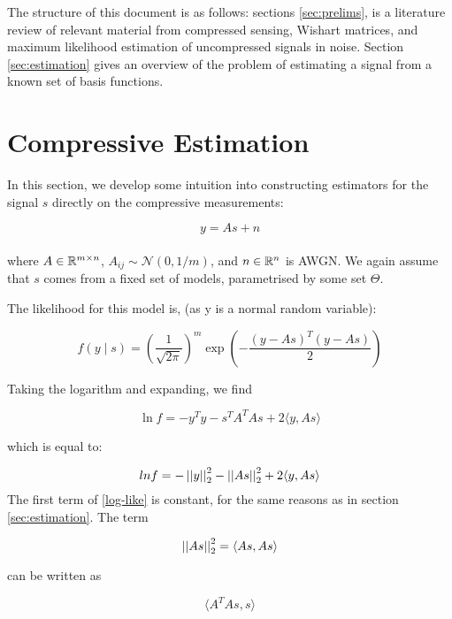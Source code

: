 The structure of this document is as follows: sections \eqref{sec:prelims}, is a literature review of relevant material from compressed sensing, Wishart matrices, and maximum likelihood estimation of uncompressed signals in noise. Section \eqref{sec:estimation} gives an overview of the problem of estimating a signal from a known set of basis functions. 

\section{Compressive Estimation} \label{sec:estimation}
In this section, we develop some intuition into constructing estimators for the signal \(s\) directly on the compressive measurements:

\begin{equation}
y = As + n
\end{equation}
\\
where \(A \in {\mathbb{R}}^{m \times n} \), \(A_{ij} \sim \mathcal{N}\left(0,1/m\right)\), and \(n \in {\mathbb{R}}^n\) is AWGN. We again assume that \(s\) comes from a fixed set of models, parametrised by some set \(\Theta\). 

The likelihood for this model is, (as y is a normal random variable):

\begin{equation}
f\left(y \mid s\right) = \left(\frac{1}{\sqrt{2\pi}} \right)^m \exp{\left( - \frac{\left(y-As\right)^T  \left(y-As\right)}{2} \right)}
\end{equation}

Taking the logarithm and expanding, we find

\begin{equation}
\ln{f} = -y^Ty - s^TA^TAs + 2\langle y, As \rangle
\end{equation}

which is equal to:

\begin{equation}
ln{f} = - \left|\left|y\right|\right|_2^2 - \left|\left|As\right|\right|_2^2 + 2\langle y, As \rangle
\label{log-like}
\end{equation}
The first term of \eqref{log-like} is constant, for the same reasons as in section \eqref{sec:estimation}. The term 

\begin{equation}
\left|\left|As\right|\right|^2_2 = \langle As, As\rangle
\end{equation}

can be written as 

\begin{equation}
\langle A^T As, s\rangle
\end{equation}

